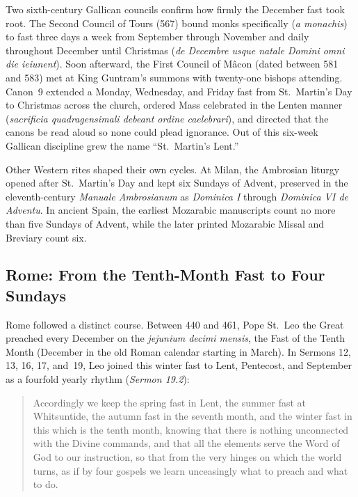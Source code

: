 Two sixth-century Gallican councils confirm how firmly the December fast
took root. The Second Council of Tours (567) bound monks specifically
(\textit{a monachis}) to fast three days a week from September through
November and daily throughout December until Christmas (\textit{de Decembre
usque natale Domini omni die ieiunent}). Soon afterward, the First Council
of M\^acon (dated between 581 and 583) met at King Guntram's summons with
twenty-one bishops attending. Canon~9 extended a Monday, Wednesday, and
Friday fast from St.~Martin's Day to Christmas across the church, ordered
Mass celebrated in the Lenten manner (\textit{sacrificia quadragensimali
debeant ordine caelebrari}), and directed that the canons be read aloud so
none could plead ignorance. Out of this six-week Gallican discipline grew
the name ``St.~Martin's Lent.''

Other Western rites shaped their own cycles. At Milan, the Ambrosian
liturgy opened after St.~Martin's Day and kept six Sundays of Advent,
preserved in the eleventh-century \textit{Manuale Ambrosianum} as
\textit{Dominica I} through \textit{Dominica VI de Adventu}. In ancient
Spain, the earliest Mozarabic manuscripts count no more than five Sundays
of Advent, while the later printed Mozarabic Missal and Breviary count six.

\subsection{Rome: From the Tenth-Month Fast to Four Sundays}

Rome followed a distinct course. Between 440 and 461, Pope St.~Leo the
Great preached every December on the \textit{jejunium decimi mensis}, the
Fast of the Tenth Month (December in the old Roman calendar starting in
March). In Sermons 12, 13, 16, 17, and~19, Leo joined this winter fast to
Lent, Pentecost, and September as a fourfold yearly rhythm (\textit{Sermon
19.2}):

\begin{quote}
Accordingly we keep the spring fast in Lent, the summer fast at
Whitsuntide, the autumn fast in the seventh month, and the winter fast in
this which is the tenth month, knowing that there is nothing unconnected
with the Divine commands, and that all the elements serve the Word of God
to our instruction, so that from the very hinges on which the world turns,
as if by four gospels we learn unceasingly what to preach and what to do.
\end{quote}

